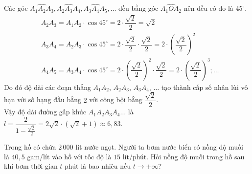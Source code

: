 \begin{ex}
{\begin{center}
		\end{center}
		Các góc $\widehat{A_1A_2A_3}, \widehat{A_2A_3A_4}, \widehat{A_3A_4A_5}, \ldots$ đều bằng góc $\widehat{A_1OA_2}$ nên đều có đo là $45^{\circ}$.
		$$
		\begin{aligned}
			& A_2 A_3=A_1 A_2 \cdot \cos 45^{\circ}=2 \cdot \dfrac{\sqrt{2}}{2}=\sqrt{2}\\
			& A_3 A_4=A_2 A_3 \cdot \cos 45^{\circ}=2 \cdot \dfrac{\sqrt{2}}{2} \cdot \dfrac{\sqrt{2}}{2}=2\cdot\left(\dfrac{\sqrt{2}}{2}\right)^2 \\
			& A_4 A_5=A_3 A_4 \cdot \cos 45^{\circ}=2 \cdot\left(\dfrac{\sqrt{2}}{2}\right)^2 \cdot \dfrac{\sqrt{2}}{2}=2 \cdot\left(\dfrac{\sqrt{2}}{2}\right)^3; \ldots
		\end{aligned}
		$$
		Do đó độ dài các đoạn thẳng $A_1A_2$, $A_2A_3$, $A_3A_4$, $\ldots$ tạo thành cấp số nhân lùi vô hạn với số hạng đầu bằng $2$ với công bội bằng $\dfrac{\sqrt{2}}{2}$.\\
		Vậy độ dài đường gấp khúc $A_1A_2A_3A_4\ldots$ là $l=\dfrac{2}{1-\tfrac{\sqrt{2}}{2}}=2\sqrt{2}\cdot(\sqrt{2}+1)\approx 6{,}83$.
	}
\end{ex}
\begin{ex}%
	Trong hồ có chứa $2\,000$ lít nước ngọt. Người ta bơm nước biển có nồng độ muối là $40{,}5$ gam/lít vào hồ với tốc độ là $15$ lít/phút. Hỏi nồng độ muối trong hồ sau khi bơm thời gian $t$ phút là bao nhiêu nếu $t \to+\infty$?
\end{ex}



